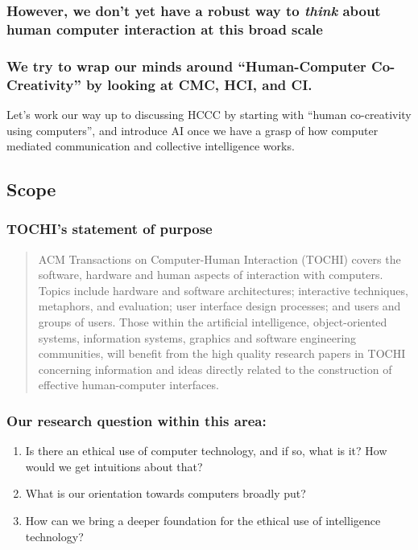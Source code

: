 \documentclass[11pt]{article}
\begin{document}
\subsubsection{However, we don’t yet have a robust way to \emph{think} about human computer interaction at this broad scale}
\label{sec:orgeb52bfc}
\subsubsection{We try to wrap our minds around “Human-Computer Co-Creativity” by looking at CMC, HCI, and CI.}
\label{sec:org4fa03ed}
Let’s work our way up to discussing HCCC by starting with “human
co-creativity using computers”, and introduce AI once we have a grasp
of how computer mediated communication and collective intelligence
works.


\subsection{Scope}
\label{sec:org20e667e}

\subsubsection{TOCHI’s statement of purpose}
\label{sec:org5e2dcfc}

\begin{quote}
ACM Transactions on Computer-Human Interaction (TOCHI) covers the
software, hardware and human aspects of interaction with
computers. Topics include hardware and software architectures;
interactive techniques, metaphors, and evaluation; user interface
design processes; and users and groups of users. Those within the
artificial intelligence, object-oriented systems, information systems,
graphics and software engineering communities, will benefit from the
high quality research papers in TOCHI concerning information and ideas
directly related to the construction of effective human-computer
interfaces.
\end{quote}

\subsubsection{Our research question within this area:}
\label{sec:org9d79ed5}
\begin{enumerate}
\item Is there an ethical use of computer technology, and if so, what is it?  How would we get intuitions about that?
\label{sec:orgfb1dfa6}
\item What is our orientation towards computers broadly put?
\label{sec:orga8e6615}
\item How can we bring a deeper foundation for the ethical use of intelligence technology?
\label{sec:org86e7d06}
\end{enumerate}
\end{document}
